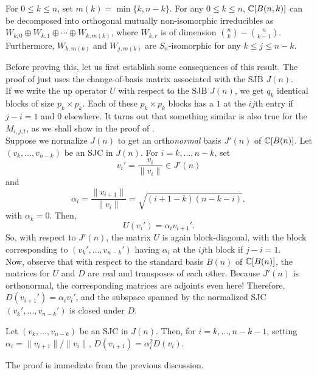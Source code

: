 	\begin{flem}
		\label{schrijver-lem1}
		For $0 \le k \le n$, set $m(k) = \min\{k,n-k\}$. For any $0 \le k \le n$, $\mathbb{C}[B(n,k)]$ can be decomposed into orthogonal mutually non-isomorphic irreducibles as $W_{k,0} \oplus W_{k,1} \oplus \cdots \oplus W_{k,m(k)}$, where $W_{k,r}$ is of dimension $\binom{n}{k} - \binom{n}{k-1}$. Furthermore, $W_{k,m(k)}$ and $W_{j,m(k)}$ are $S_n$-isomorphic for any $k \le j \le n-k$.
	\end{flem}

	Before proving this, let us first establish some consequences of this result. The proof of  just uses the change-of-basis matrix associated with the SJB $J(n)$. \\

	If we write the up operator $U$ with respect to the SJB $J(n)$, we get $q_k$ identical blocks of size $p_k \times p_k$. Each of these $p_k \times p_k$ blocks has a $1$ at the $ij$th entry if $j-i=1$ and $0$ elsewhere. It turns out that something similar is also true for the $M_{i,j,t}$, as we shall show in the proof of .\\
	Suppose we normalize $J(n)$ to get an ortho\emph{normal} basis $J'(n)$ of $\mathbb{C}[B(n)]$. Let $(v_k,\ldots,v_{n-k})$ be an SJC in $J(n)$. For $i=k,\ldots,n-k$, set
	\[ v_i' = \frac{v_i}{\|v_i\|} \in J'(n) \]
	and
	\[ \alpha_i = \frac{\|v_{i+1}\|}{\|v_i\|} = \sqrt{(i+1-k)(n-k-i)}, \]
	with $\alpha_k = 0$. Then,
	\[ U(v_i') = \alpha_i v_{i+1}'. \]
	So, with respect to $J'(n)$, the matrix $U$ is again block-diagonal, with the block corresponding to $(v_k',\ldots,v_{n-k}')$ having $\alpha_i$ at the $ij$th block if $j-i=1$. \\
	Now, observe that with respect to the standard basis $B(n)$ of $\mathbb{C}[B(n)]$, the matrices for $U$ and $D$ are real and transposes of each other. Because $J'(n)$ is orthonormal, the corresponding matrices are adjoints even here! Therefore, $D(v_{i+1}') = \alpha_i v_i'$, and the subspace spanned by the normalized SJC $(v_k',\ldots,v_{n-k}')$ is closed under $D$.

	\begin{fprop}
		\label{prop:d-on-sjc}
		Let $(v_k,\ldots,v_{n-k})$ be an SJC in $J(n)$. Then, for $i=k,\ldots,n-k-1$, setting $\alpha_i = \|v_{i+1}\|/\|v_i\|$, $D(v_{i+1}) = \alpha_i^2 D(v_i)$.
	\end{fprop}
	The proof is immediate from the previous discussion.

